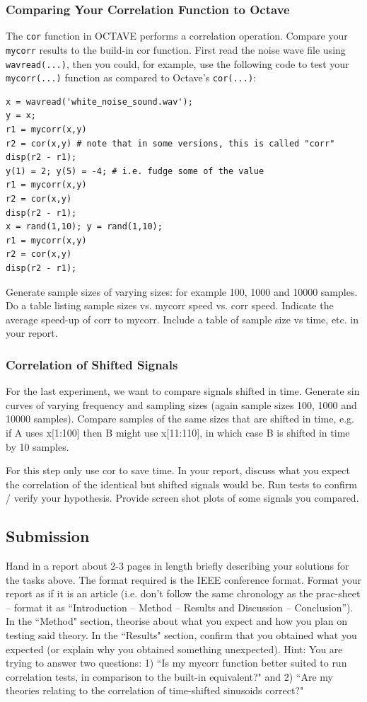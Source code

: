 \subsubsection{Comparing Your Correlation Function to Octave}
The \verb|cor| function in OCTAVE performs a correlation operation. Compare your \verb|mycorr| results to the build-in cor function. First read the noise wave file using \verb|wavread(...)|, then you could, for example, use the following code to test your \verb|mycorr(...)| function as compared to Octave’s \verb|cor(...)|:
\begin{lstlisting}
x = wavread('white_noise_sound.wav');
y = x;
r1 = mycorr(x,y)
r2 = cor(x,y) # note that in some versions, this is called "corr"
disp(r2 - r1);
y(1) = 2; y(5) = -4; # i.e. fudge some of the value
r1 = mycorr(x,y)
r2 = cor(x,y)
disp(r2 - r1);
x = rand(1,10); y = rand(1,10);
r1 = mycorr(x,y)
r2 = cor(x,y)
disp(r2 - r1);
\end{lstlisting}

Generate sample sizes of varying sizes: for example 100, 1000 and 10000 samples. Do a table listing sample sizes vs. mycorr speed vs. corr speed. Indicate the average speed-up of corr to mycorr. Include a table of sample size vs time, etc. in your report.

\subsubsection{Correlation of Shifted Signals}
For the last experiment, we want to compare signals shifted in time. Generate sin curves of varying frequency and sampling sizes (again sample sizes 100, 1000 and 10000 samples). Compare samples of the same sizes that are shifted in time, e.g. if A uses x[1:100] then B might use x[11:110], in which case B is shifted in time by 10 samples.

For this step only use cor to save time. In your report, discuss what you expect the correlation of the identical but shifted signals would be. Run tests to confirm / verify your hypothesis. Provide screen shot plots of some signals you compared.


\subsection{Submission}
Hand in a report about 2-3 pages in length briefly describing your solutions for the tasks above. The format required is the IEEE conference format. Format your report as if it is an article (i.e. don’t follow the same chronology as the prac-sheet – format it as “Introduction – Method – Results and Discussion – Conclusion”). In the ``Method" section, theorise about what you expect and how you plan on testing said theory. In the ``Results" section, confirm that you obtained what you expected (or explain why you obtained something unexpected). Hint: You are trying to answer two questions: 1) ``Is my mycorr function better suited
to run correlation tests, in comparison to the built-in equivalent?" and 2) ``Are my theories relating to the correlation of time-shifted sinusoids correct?"

